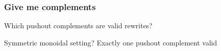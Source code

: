 \begin{frame}
    \frametitle{Give me complements}

    \centering
    \LARGE
    Which pushout complements are \alert{valid} rewrites?

    \pause
    \large
    \alert{Symmetric monoidal} setting? \alert{Exactly one} pushout complement valid

    \scalebox{0.5}{\hypergraphpeople}





\end{frame}
